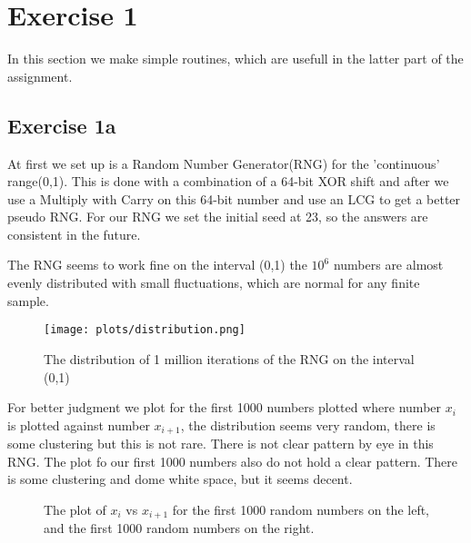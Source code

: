 \section{Exercise 1}
In this section we make simple routines, which are usefull in the latter part of the assignment.

\subsection{Exercise 1a}
At first we set up is a Random Number Generator(RNG) for the 'continuous' range(0,1). This is done with a combination of a 64-bit XOR shift and after we use a Multiply with Carry on this 64-bit number and use an LCG to get a better pseudo RNG. For our RNG we set the initial seed at 23, so the answers are consistent in the future. 


%

The RNG seems to work fine on the interval (0,1) the $10^6$ numbers are almost evenly distributed with small fluctuations, which are normal for any finite sample.
\begin{figure}[h]
   \centering
   \texttt{[image: plots/distribution.png]}
      \caption{The distribution of 1 million iterations of the RNG on the interval (0,1)}
   \end{figure}
  
 
 For better judgment we plot for the first 1000 numbers plotted where number $x_i$ is plotted against number $x_{i+1}$, the distribution seems very random, there is some clustering but this is not rare. There is not clear pattern by eye in this RNG. The plot fo our first 1000 numbers also do not hold a clear pattern. There is some clustering and dome white space, but it seems decent.
 
\begin{figure}
   \centering
    \qquad
    \caption{The plot of $x_i$ vs $x_{i+1}$ for the first 1000 random numbers on the left, and the first 1000 random numbers on the right. }
    \end{figure}
    
    
